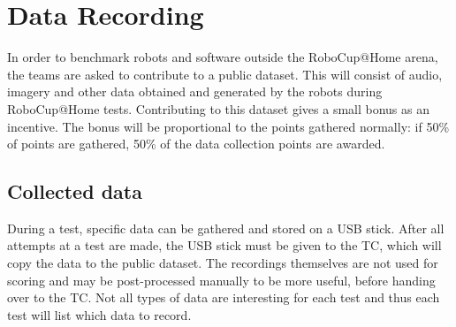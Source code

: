 \section{Data Recording}
  \label{rule:datarecording}
  In order to benchmark robots and software outside the RoboCup@Home arena, the teams are asked to contribute to a public dataset.
  This will consist of audio, imagery and other data obtained and generated by the robots during RoboCup@Home tests.
  Contributing to this dataset gives a small bonus as an incentive. 
  The bonus will be proportional to the points gathered normally: 
    if 50\% of points are gathered, 50\% of the data collection points are awarded. 
    
  \subsection{Collected data}
    During a test, specific data can be gathered and stored on a USB stick. 
    After all attempts at a test are made, the USB stick must be given to the TC, which will copy the data to the public dataset.
    The recordings themselves are not used for scoring and may be post-processed manually to be more useful, before handing over to the TC. 
    Not all types of data are interesting for each test and thus each test will list which data to record. 
    
